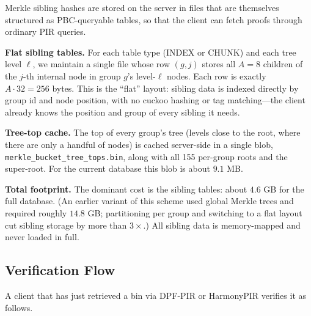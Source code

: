 Merkle sibling hashes are stored on the server in files that are themselves structured as PBC-queryable tables, so that the client can fetch proofs through ordinary PIR queries.

\textbf{Flat sibling tables.} For each table type (INDEX or CHUNK) and each tree level $\ell$, we maintain a single file whose row $(g, j)$ stores all $A = 8$ children of the $j$-th internal node in group $g$'s level-$\ell$ nodes. Each row is exactly $A \cdot 32 = 256$ bytes. This is the ``flat'' layout: sibling data is indexed directly by group id and node position, with no cuckoo hashing or tag matching---the client already knows the position and group of every sibling it needs.

\textbf{Tree-top cache.} The top of every group's tree (levels close to the root, where there are only a handful of nodes) is cached server-side in a single blob, \texttt{merkle\_bucket\_tree\_tops.bin}, along with all 155 per-group roots and the super-root. For the current database this blob is about $9.1$ MB.

\textbf{Total footprint.} The dominant cost is the sibling tables: about $4.6$ GB for the full database. (An earlier variant of this scheme used global Merkle trees and required roughly $14.8$ GB; partitioning per group and switching to a flat layout cut sibling storage by more than $3\times$.) All sibling data is memory-mapped and never loaded in full.

\subsection{Verification Flow}
\label{sec:merkle-verify}

A client that has just retrieved a bin via DPF-PIR or HarmonyPIR verifies it as follows.

